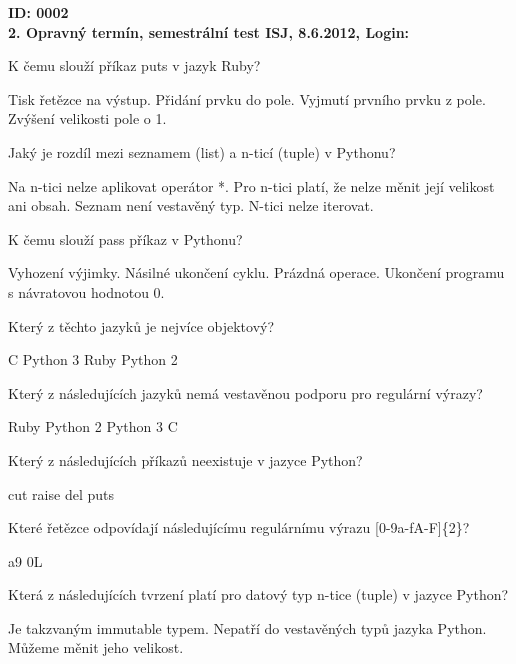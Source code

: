 \documentclass[addpoints,12pt]{exam}
\begin{document}
\setlength{\parindent}{0in}
\pagestyle{empty}
\textbf{ID: 0002}
\\
\textbf{2. Opravný termín, semestrální test ISJ, 8.6.2012, Login:}
\\
\hrulefill
\begin{questions}

\question[2]
K čemu slouží příkaz puts v jazyk Ruby?
\nopagebreak
\begin{choices}
\choice
Tisk řetězce na výstup.
\choice
Přidání prvku do pole.
\choice
Vyjmutí prvního prvku z pole.
\choice
Zvýšení velikosti pole o 1.
\end{choices}
\question[2]
Jaký je rozdíl mezi seznamem (list) a n-ticí (tuple) v Pythonu?
\nopagebreak
\begin{choices}
\choice
Na n-tici nelze aplikovat operátor *.
\choice
Pro n-tici platí, že nelze měnit její velikost ani obsah.
\choice
Seznam není vestavěný typ.
\choice
N-tici nelze iterovat.
\end{choices}
\question[2]
K čemu slouží pass příkaz v Pythonu?
\nopagebreak
\begin{choices}
\choice
Vyhození výjimky.
\choice
Násilné ukončení cyklu.
\choice
Prázdná operace.
\choice
Ukončení programu s návratovou hodnotou 0.
\end{choices}
\question[2]
Který z těchto jazyků je nejvíce objektový?
\nopagebreak
\begin{choices}
\choice
C
\choice
Python 3
\choice
Ruby
\choice
Python 2
\end{choices}
\question[2]
Který z následujících jazyků nemá vestavěnou podporu pro regulární výrazy?
\nopagebreak
\begin{choices}
\choice
Ruby
\choice
Python 2
\choice
Python 3
\choice
C
\end{choices}
\question[2]
Který z následujících příkazů neexistuje v jazyce Python?
\nopagebreak
\begin{choices}
\choice
cut
\choice
raise
\choice
del
\choice
puts
\end{choices}
\question[2]
Které řetězce odpovídají následujícímu regulárnímu výrazu [0-9a-fA-F]\{2\}?
\nopagebreak
\begin{choices}
\choice
a9
\choice
0L
\end{choices}
\question[2]
Která z následujících tvrzení platí pro datový typ n-tice (tuple) v jazyce Python?
\nopagebreak
\begin{choices}
\choice
Je takzvaným immutable typem.
\choice
Nepatří do vestavěných typů jazyka Python.
\choice
Můžeme měnit jeho velikost.

\end{choices}
\end{questions}
\end{document}
